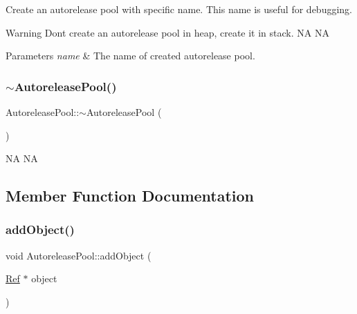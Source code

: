 Create an autorelease pool with specific name. This name is useful for debugging. \begin{DoxyWarning}{Warning}
Don\textquotesingle{}t create an autorelease pool in heap, create it in stack.  NA  NA
\end{DoxyWarning}

\begin{DoxyParams}{Parameters}
{\em name} & The name of created autorelease pool. \\
\hline
\end{DoxyParams}
\mbox{\label{classAutoreleasePool_ab44bff785343ae6d16dc67b9f4812079}} 
\subsubsection{\texorpdfstring{$\sim$\+Autorelease\+Pool()}{~AutoreleasePool()}\hspace{0.1cm}{\footnotesize\ttfamily [2/2]}}
{\footnotesize\ttfamily Autorelease\+Pool\+::$\sim$\+Autorelease\+Pool (\begin{DoxyParamCaption}{ }\end{DoxyParamCaption})}

NA  NA 

\subsection{Member Function Documentation}
\mbox{\label{classAutoreleasePool_ad040d66ae891c4593ed8939bb53ce539}} 
\subsubsection{\texorpdfstring{add\+Object()}{addObject()}\hspace{0.1cm}{\footnotesize\ttfamily [1/2]}}
{\footnotesize\ttfamily void Autorelease\+Pool\+::add\+Object (\begin{DoxyParamCaption}\item[{\hyperlink{classRef}{Ref} $\ast$}]{object }\end{DoxyParamCaption})}

